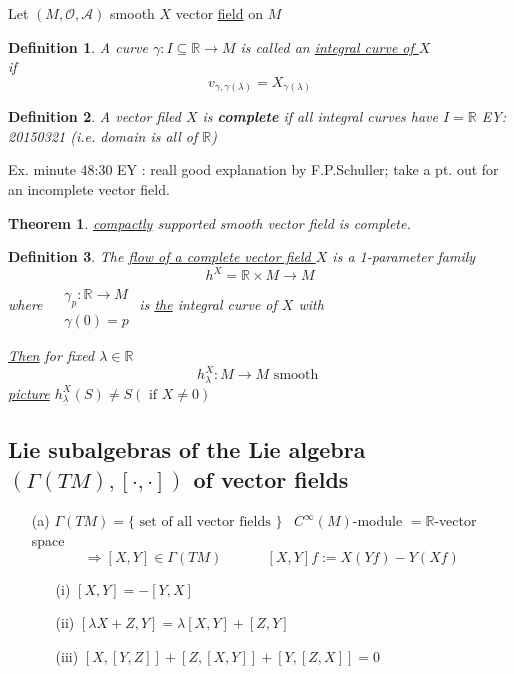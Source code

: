 \documentclass[10pt]{amsart}
\newtheorem{theorem}{Theorem}
\newtheorem{definition}{Definition}
\begin{document}
\begin{multicols*}{2}
	Let $(M,\mathcal{O},\mathcal{A})$ smooth $X$ vector \underline{field} on $M$
	
	\begin{definition}
		A curve $\gamma :I \subseteq \mathbb{R} \to M$ is called an \underline{integral curve of $X$} \\
		if 
		\[
		v_{\gamma,\gamma(\lambda)} = X_{\gamma(\lambda)}
		\]
	\end{definition}
	
	\begin{definition} A vector filed $X$ is \textbf{complete} if all integral curves have $I = \mathbb{R}$ EY: 20150321 (i.e. domain is all of $\mathbb{R}$)
	\end{definition}
	
	Ex. minute 48:30 EY : reall good explanation by F.P.Schuller; take a pt. out for an incomplete vector field.
	
	\begin{theorem}
		\underline{compactly} supported smooth vector field is complete.  
	\end{theorem}
	
	\begin{definition} The \underline{flow of a complete vector field $X$} is a 1-parameter family
		\[
		h^X = \mathbb{R}\times M \to M
		\]
		where $\begin{aligned} & \quad \\ 
		& \gamma_p : \mathbb{R} \to M \\
		& \gamma(0) = p \end{aligned}$ is \underline{the} integral curve of $X$ with 
		
		\underline{Then} for fixed $\lambda \in \mathbb{R}$ 
		\[
		h_{\lambda}^X : M \to M \text{ smooth }
		\]
		\underline{picture}  $h^X_{\underline{\lambda}}(S) \neq S (\text{ if } X \neq 0 )$
	\end{definition}
	
	\subsection{Lie subalgebras of the Lie algebra $(\Gamma(TM) , [ \cdot , \cdot ] )$ of vector fields}
	
	\begin{enumerate}
		\item[(a)] $\Gamma(TM) = \lbrace \text{ set of all vector fields } \rbrace$ \quad \, $C^{\infty}(M)$-module $ = \mathbb{R}$-vector space \[
		\Longrightarrow [X,Y] \in \Gamma(TM) \quad \quad \quad \, [X,Y] f := X(Yf) - Y(Xf)
		\]
		\begin{enumerate}
			\item[(i)] $[X,Y] = -[Y,X]$ 
			\item[(ii)] $[\lambda X + Z, Y] = \lambda [X,Y] + [Z,Y]$
			\item[(iii)] $[X,[Y,Z]]  + [Z,[X,Y]] + [Y,[Z,X]] =0$ 
			

\end{enumerate}
\end{enumerate}
\end{multicols*}
\end{document}
